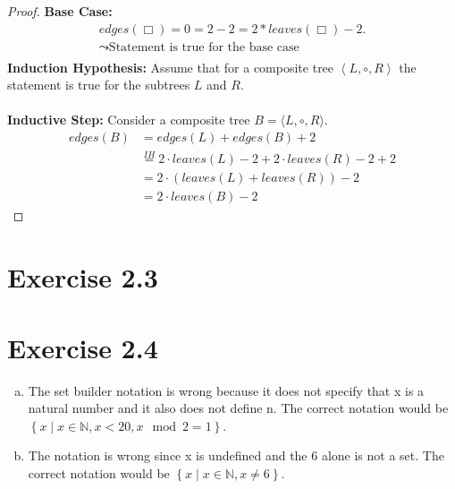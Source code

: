 \documentclass{article} %
\newcommand{\homeworkNumber}{2}
\begin{document}
\begin{proof}
	\textbf{Base Case:}
	\begin{align*}
		edges(\Box) = 0 = 2 - 2 = 2 * leaves(\Box) - 2 .     \\
		\leadsto \text{Statement is true for the base case } \\
	\end{align*}
	\textbf{Induction Hypothesis:} Assume that for a composite tree \( \left< L, \circ, R \right> \) the statement is true for the subtrees \( L \) and \( R \).
	\\
	\\
	\textbf{Inductive Step:}
	Consider a composite tree \( B = \langle L, \circ, R \rangle \).
	\begin{align*}
		edges(B) & = edges(L) + edges(B) + 2                                          \\
		         & \stackrel{IH}{=} 2 \cdot leaves(L) - 2 + 2 \cdot leaves(R) - 2 + 2 \\
		         & = 2 \cdot (leaves(L) + leaves(R)) -2                               \\
		         & = 2 \cdot leaves(B) - 2
	\end{align*}

\end{proof}
\newpage

\section*{Exercise \homeworkNumber.3}

\newpage

\section*{Exercise \homeworkNumber.4}
\begin{enumerate}[(a)]
	\item The set builder notation is wrong because it does not specify that x is a natural number and it also does not define n.
	      The correct notation would be \(\left\{ x \mid x \in \mathbb{N}, x < 20, x \mod 2 = 1 \right\}\).
	\item The notation is wrong since x is undefined and the 6 alone is not a set.
	      The correct notation would be \( \left\{ x \mid x \in \mathbb{N}, x \neq 6 \right\} \).
\end{enumerate}
\newpage
\end{document}
